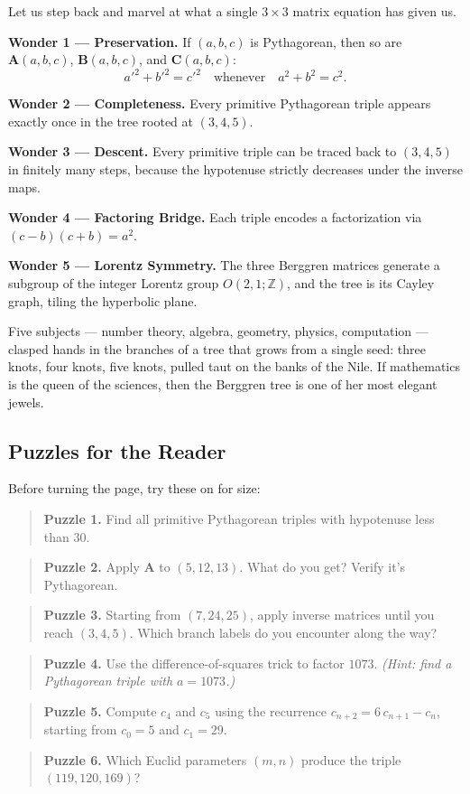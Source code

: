 \documentclass[11pt,twoside,openright]{book}
\theoremstyle{definition}
\theoremstyle{remark}
\begin{document}
Let us step back and marvel at what a single $3 \times 3$ matrix equation has given us.

\textbf{Wonder 1 --- Preservation.} If $(a, b, c)$ is Pythagorean, then so are $\mathbf{A}(a,b,c)$, $\mathbf{B}(a,b,c)$, and $\mathbf{C}(a,b,c)$:
\[a'^2 + b'^2 = c'^2 \quad \text{whenever} \quad a^2 + b^2 = c^2.\]

\textbf{Wonder 2 --- Completeness.} Every primitive Pythagorean triple appears exactly once in the tree rooted at $(3, 4, 5)$.

\textbf{Wonder 3 --- Descent.} Every primitive triple can be traced back to $(3, 4, 5)$ in finitely many steps, because the hypotenuse strictly decreases under the inverse maps.

\textbf{Wonder 4 --- Factoring Bridge.} Each triple encodes a factorization via $(c - b)(c + b) = a^2$.

\textbf{Wonder 5 --- Lorentz Symmetry.} The three Berggren matrices generate a subgroup of the integer Lorentz group $O(2,1;\mathbb{Z})$, and the tree is its Cayley graph, tiling the hyperbolic plane.


Five subjects --- number theory, algebra, geometry, physics, computation --- clasped hands in the branches of a tree that grows from a single seed: three knots, four knots, five knots, pulled taut on the banks of the Nile. If mathematics is the queen of the sciences, then the Berggren tree is one of her most elegant jewels.


\subsection{Puzzles for the Reader}

Before turning the page, try these on for size:

\begin{quote}
\textbf{Puzzle 1.} Find all primitive Pythagorean triples with hypotenuse less than $30$.
\end{quote}
\begin{quote}
\textbf{Puzzle 2.} Apply $\mathbf{A}$ to $(5, 12, 13)$. What do you get? Verify it's Pythagorean.
\end{quote}
\begin{quote}
\textbf{Puzzle 3.} Starting from $(7, 24, 25)$, apply inverse matrices until you reach $(3, 4, 5)$. Which branch labels do you encounter along the way?
\end{quote}
\begin{quote}
\textbf{Puzzle 4.} Use the difference-of-squares trick to factor $1073$. \textit{(Hint: find a Pythagorean triple with $a = 1073$.)}
\end{quote}
\begin{quote}
\textbf{Puzzle 5.} Compute $c_4$ and $c_5$ using the recurrence $c_{n+2} = 6\,c_{n+1} - c_n$, starting from $c_0 = 5$ and $c_1 = 29$.
\end{quote}
\begin{quote}
\textbf{Puzzle 6.} Which Euclid parameters $(m, n)$ produce the triple $(119, 120, 169)$?
\end{quote}
\end{document}
